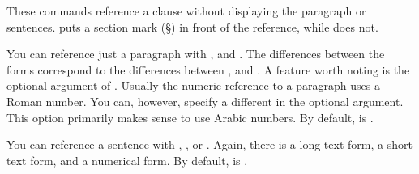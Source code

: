 \begin{Declaration}
\end{Declaration}
These commands reference a clause without displaying the paragraph or
sentences.  puts a section mark (\S) in front of the
reference, while  does not.%
\EndIndexGroup


\begin{Declaration}
\end{Declaration}
You can reference just a paragraph with ,  and
. The differences between the forms correspond to the
differences between ,
 and . A feature
worth noting is the optional argument of . Usually the numeric
reference to a paragraph uses a Roman number. You can, however, specify a
different  in the optional argument. This option
primarily makes sense to use Arabic numbers. By default,  is
.%
\EndIndexGroup


\begin{Declaration}
\end{Declaration}
You can reference a sentence with , ,
or . Again, there is a long text form, a short text form,
and a numerical form. By default,  is
.%
\EndIndexGroup



